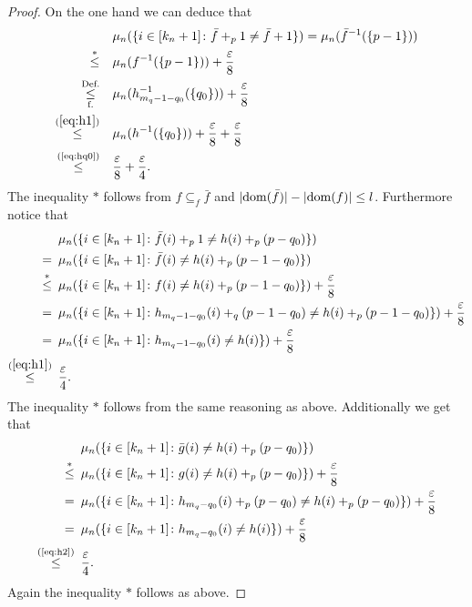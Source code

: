 \begin{proof}
  On the one hand we can deduce that
  \begin{align*}
    &\mu_n(\{i \in [k_n+1]\colon \bar{f} +_p 1 \neq \bar{f} + 1\}) = \mu_n(\bar{f}^{-1}(\{p-1\})) \\
    \overset{*}{\leq} \hspace*{10px} &\mu_n(f^{-1}(\{p-1\})) + {\varepsilon \over 8} \\
    \underset{\text{f.}}{\overset{\text{Def.}}{\leq}} \hspace*{10px} &\mu_n(\h^{-1}(\{q_0\})) + {\varepsilon \over 8} \\
    \overset{(\ref{eq:h1})}{\leq} \hspace*{10px}&\mu_n(h^{-1}(\{q_0\})) + {\varepsilon \over 8} + {\varepsilon \over 8} \\
    \overset{\text{(\ref{eq:hq0})}}{\leq} \hspace*{10px}&{\varepsilon \over 8} + {\varepsilon \over 4}.
  \end{align*}
  The inequality $*$ follows from $f \subseteq_f \bar{f}$ and $|{\rm dom}(\bar{f})| - |{\rm dom}(f)| \leq l$.
  Furthermore notice that
  \begin{align*}
      &\mu_n(\{i \in [k_n+1]\colon \bar{f}(i) +_p 1 \neq h(i) +_p (p-q_0)\}) \\
    = \hspace*{5px} &\mu_n(\{i \in [k_n+1]\colon \bar{f}(i) \neq h(i) +_p (p-1-q_0)\}) \\
    \overset{*}{\leq} \hspace*{5px}&\mu_n(\{i \in [k_n+1]\colon f(i) \neq h(i) +_p (p-1-q_0)\}) + {\varepsilon \over 8} \\
    = \hspace*{5px}&\mu_n(\{i \in [k_n+1]\colon \h(i) +_q (p-1-q_0) \neq h(i) +_p (p-1-q_0)\}) + {\varepsilon \over 8} \\
    = \hspace*{5px}&\mu_n(\{i \in [k_n+1]\colon \h(i) \neq h(i) \}) + {\varepsilon \over 8} \\
    \overset{(\ref{eq:h1})}{\leq} \hspace*{5px}&{\varepsilon \over 4}.
  \end{align*}
  The inequality $*$ follows from the same reasoning as above.
  Additionally we get that
  \begin{align*}
    &\mu_n(\{i\in [k_n+1]\colon \bar{g}(i) \neq h(i) +_p (p-q_0)\}) \\
    \overset{*}{\leq} \hspace*{5px}&\mu_n(\{i\in [k_n+1]\colon g(i) \neq h(i) +_p (p-q_0)\}) + {\varepsilon \over 8} \\
    = \hspace*{5px}&\mu_n(\{i\in [k_n+1]\colon \hh(i) +_p (p-q_0) \neq h(i) +_p (p-q_0)\}) + {\varepsilon \over 8} \\
    = \hspace*{5px}&\mu_n(\{i\in [k_n+1]\colon \hh(i) \neq h(i) \}) + {\varepsilon \over 8} \\
    \overset{\text{(\ref{eq:h2})}}{\leq} \hspace*{5px} &{\varepsilon \over 4}.
  \end{align*} 
  Again the inequality $*$ follows as above.


\end{proof}
